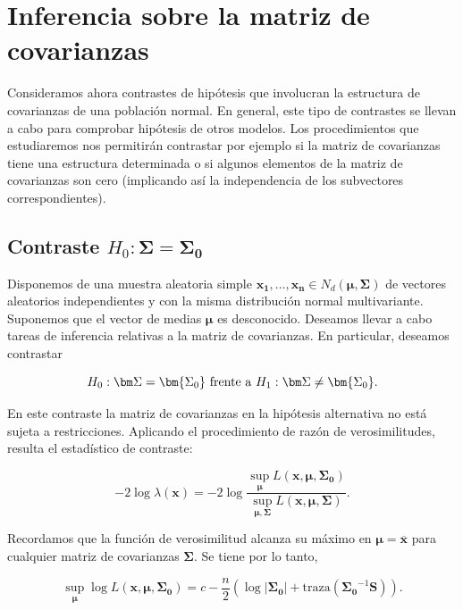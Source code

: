 \documentclass[
  a4paper,
  oneside]{scrbook}
\theoremstyle{definition}
\theoremstyle{definition}
\theoremstyle{definition}
\theoremstyle{definition}
\theoremstyle{remark}
\begin{document}
\section{Inferencia sobre la matriz de covarianzas}\label{inferencia-sobre-la-matriz-de-covarianzas}

Consideramos ahora contrastes de hipótesis que involucran la estructura
de covarianzas de una población normal. En general, este tipo de
contrastes se llevan a cabo para comprobar hipótesis de otros modelos.
Los procedimientos que estudiaremos nos permitirán contrastar por
ejemplo si la matriz de covarianzas tiene una estructura determinada o
si algunos elementos de la matriz de covarianzas son cero (implicando
así la independencia de los subvectores correspondientes).

\subsection{\texorpdfstring{Contraste \(H_0: \bm\Sigma=\bm{\Sigma_0}\)}{Contraste H\_0: \textbackslash bm\textbackslash Sigma=\textbackslash bm\{\textbackslash Sigma\_0\}}}\label{contraste-h-0-bm-sigma-bm-sigma-0}

Disponemos de una muestra aleatoria simple
\(\bm{x_1},\ldots,\bm{x_n}\in N_d(\bm{\mu},\bm\Sigma)\) de vectores
aleatorios independientes y con la misma distribución normal
multivariante. Suponemos que el vector de medias \(\bm{\mu}\) es
desconocido. Deseamos llevar a cabo tareas de inferencia relativas a la
matriz de covarianzas. En particular, deseamos contrastar

\[H_0: \bm\Sigma=\bm{\Sigma_0} \textnormal{ frente a } H_1: \bm\Sigma\neq\bm{\Sigma_0}.\]

En este contraste la matriz de covarianzas en la hipótesis alternativa
no está sujeta a restricciones. Aplicando el procedimiento de razón de
verosimilitudes, resulta el estadístico de contraste:

\[-2\log \lambda(\bm{x})
=-2\log \frac{\sup_{\bm{\mu}} L\left(\bm{x}, \bm{\mu},\bm{\Sigma_0}\right)}
{\sup_{\bm{\mu},\bm\Sigma} L\left(\bm{x}, \bm{\mu},\bm\Sigma\right)}.\]

Recordamos que la función de verosimilitud alcanza su máximo en
\(\bm{\mu}=\overline{\bm{x}}\) para cualquier matriz de covarianzas
\(\bm\Sigma\). Se tiene por lo tanto,

\[\sup_{\bm{\mu}} \log L\left(\bm{x}, \bm{\mu},\bm{\Sigma_0}\right)
= c - \frac{n}{2} \left( \log|\bm{\Sigma_0}|
+ \mbox{traza}\left(\bm{\Sigma_0}^{-1}\bm{S}\right) \right).\]
\end{document}
